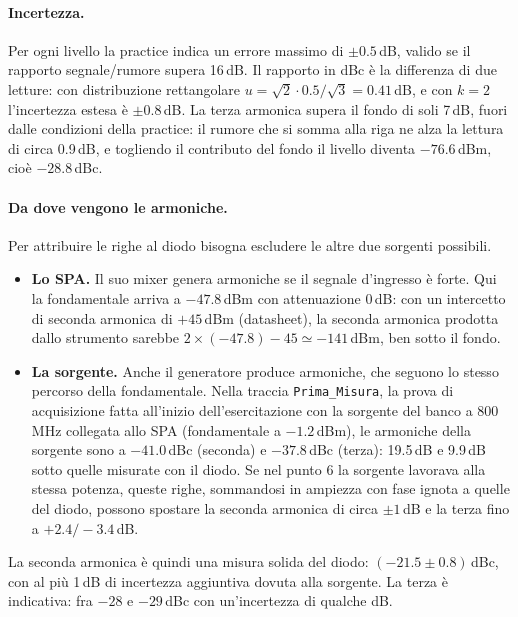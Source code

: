 \documentclass[11pt,a4paper,oneside]{book}
\begin{document}
\paragraph{Incertezza.} Per ogni livello la practice indica un errore massimo di $\pm 0.5$\,dB, valido se il rapporto segnale/rumore supera 16\,dB. Il rapporto in dBc è la differenza di due letture: con distribuzione rettangolare $u = \sqrt2 \cdot 0.5/\sqrt3 = 0.41$\,dB, e con $k = 2$ l'incertezza estesa è $\pm 0.8$\,dB. La terza armonica supera il fondo di soli 7\,dB, fuori dalle condizioni della practice: il rumore che si somma alla riga ne alza la lettura di circa 0.9\,dB, e togliendo il contributo del fondo il livello diventa $-76.6$\,dBm, cioè $-28.8$\,dBc.

\paragraph{Da dove vengono le armoniche.} Per attribuire le righe al diodo bisogna escludere le altre due sorgenti possibili.
\begin{itemize}
  \item \textbf{Lo SPA.} Il suo mixer genera armoniche se il segnale d'ingresso è forte. Qui la fondamentale arriva a $-47.8$\,dBm con attenuazione 0\,dB: con un intercetto di seconda armonica di $+45$\,dBm (datasheet), la seconda armonica prodotta dallo strumento sarebbe $2 \times (-47.8) - 45 \simeq -141$\,dBm, ben sotto il fondo.
  \item \textbf{La sorgente.} Anche il generatore produce armoniche, che seguono lo stesso percorso della fondamentale. Nella traccia \texttt{Prima\_Misura}, la prova di acquisizione fatta all'inizio dell'esercitazione con la sorgente del banco a 800\,MHz collegata allo SPA (fondamentale a $-1.2$\,dBm), le armoniche della sorgente sono a $-41.0$\,dBc (seconda) e $-37.8$\,dBc (terza): 19.5\,dB e 9.9\,dB sotto quelle misurate con il diodo. Se nel punto 6 la sorgente lavorava alla stessa potenza, queste righe, sommandosi in ampiezza con fase ignota a quelle del diodo, possono spostare la seconda armonica di circa $\pm 1$\,dB e la terza fino a $+2.4/-3.4$\,dB.
\end{itemize}
La seconda armonica è quindi una misura solida del diodo: $(-21.5 \pm 0.8)$\,dBc, con al più 1\,dB di incertezza aggiuntiva dovuta alla sorgente. La terza è indicativa: fra $-28$ e $-29$\,dBc con un'incertezza di qualche dB.
\end{document}
